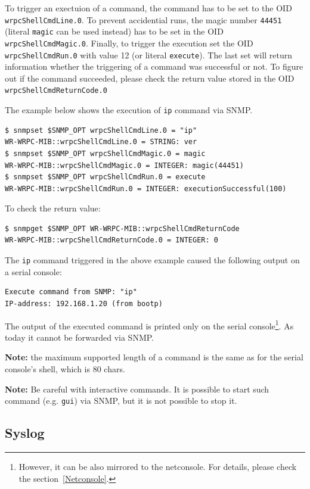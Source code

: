 \documentclass[a4paper, 12pt]{article}
\renewcommand{\_}{\underscore\allowbreak}
\begin{document}
To trigger an exectuion of a command, the command has to be set to
the OID \texttt{wrpcShellCmdLine.0}. To prevent accidential runs, the magic
number \texttt{44451} (literal \texttt{magic} can be used instead) has to be
set in the OID \texttt{wrpcShellCmdMagic.0}.
Finally, to trigger the execution set the OID \texttt{wrpcShellCmdRun.0} with
value 12 (or literal \texttt{execute}). The last set will return information
whether the triggering of a command was successful or not. To figure out if
the command succeeded, please check the return value stored in the OID
\texttt{wrpcShellCmdReturnCode.0}

The example below shows the execution of \texttt{ip} command via SNMP.
\begin{lstlisting}
$ snmpset $SNMP_OPT wrpcShellCmdLine.0 = "ip"
WR-WRPC-MIB::wrpcShellCmdLine.0 = STRING: ver
$ snmpset $SNMP_OPT wrpcShellCmdMagic.0 = magic
WR-WRPC-MIB::wrpcShellCmdMagic.0 = INTEGER: magic(44451)
$ snmpset $SNMP_OPT wrpcShellCmdRun.0 = execute
WR-WRPC-MIB::wrpcShellCmdRun.0 = INTEGER: executionSuccessful(100)
\end{lstlisting}

To check the return value:
\begin{lstlisting}
$ snmpget $SNMP_OPT WR-WRPC-MIB::wrpcShellCmdReturnCode
WR-WRPC-MIB::wrpcShellCmdReturnCode.0 = INTEGER: 0
\end{lstlisting}

The \texttt{ip} command triggered in the above example caused the following
output on a serial console:
\begin{lstlisting}
Execute command from SNMP: "ip"
IP-address: 192.168.1.20 (from bootp)
\end{lstlisting}

The output of the executed command is printed only on the serial
console\footnote{However, it can be also mirrored to the netconsole.
For details, please check the section~\ref{Netconsole}.}.
As today it cannot be forwarded via SNMP.

\textbf{Note:} the maximum supported length of a command is the same as for
the serial console's shell, which is 80 chars.

\textbf{Note:} Be careful with interactive commands. It is possible to start
such command (e.g. \texttt{gui}) via SNMP, but it is not possible to stop it.

\newpage
\subsection{Syslog}
\label{Syslog}
\end{document}
